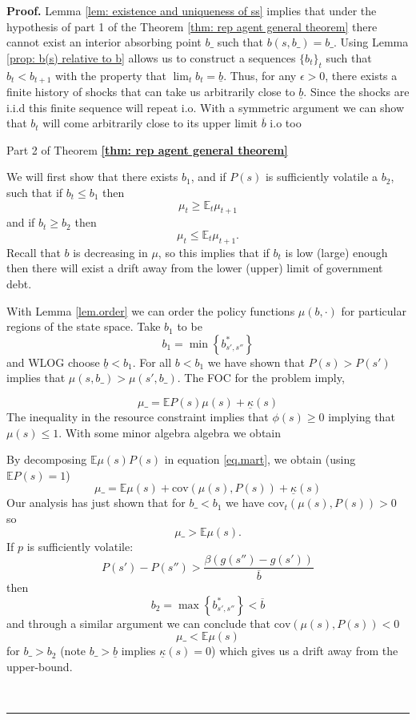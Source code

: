 \documentclass[thmsb,11pt]{article}
\newcommand{\EE}{\mathbb E}
\newcommand{\cov}{\mathrm{cov}}
\newenvironment{proof}[1][Proof]{\noindent \textbf{#1.} }{\  \rule{0.5em}{0.5em}}
\begin{document}
\begin{proof}
Lemma  \ref{lem: existence and uniqueness of ss}  implies that under the hypothesis of part 1 of the Theorem \ref{thm: rep agent general theorem} there cannot exist an interior absorbing point $b\_$ such that $b(s,b\_)=b\_$. Using Lemma \ref{prop: b(s) relative to b} allows us to construct a sequences $\{b_t\}_t $ such that $b_t<b_{t+1}$ with the property that $\lim_tb_t=\underline{b}$.
Thus, for any $\epsilon>0$, there exists a finite history of shocks that can take us arbitrarily close to $\underline{b}$. Since the shocks are i.i.d this finite sequence will repeat i.o. With a symmetric argument we can show that $b_t$ will come arbitrarily close to its upper limit $\overline{b}$ i.o too





{Part 2 of Theorem \textbf{\ref{thm: rep agent general theorem}}}


We will first show that there exists $b_1$, and if $P(s)$ is sufficiently volatile a $b_2$, such that if $b_t\leq b_1$ then
\[
	\mu_t \geq \EE_t \mu_{t+1}
\] and if $b_t \geq b_2$ then
\[
	\mu_t \leq \EE_t \mu_{t+1}.
\]  Recall that $b$ is decreasing in $\mu$, so this implies that if $b_t$ is low (large) enough then there will exist a drift away from the lower (upper) limit of government debt.

With Lemma \ref{lem.order} we can order the policy functions $\mu(b,\cdot)$ for particular regions of the state space.  Take $b_1$ to be
\[
	b_1 = \min\left\{b^*_{s',s''}\right\}
\] and WLOG choose $\underline b < b_1$.  For all $b < b_1$ we have shown that $P(s) > P(s')$ implies that $\mu(s,b\_) > \mu(s',b\_)$.  The FOC for the problem imply,

\begin{equation}\label{eq.mart}
	\mu\_ = \EE P(s)\mu(s)+\underline{\kappa}(s)
\end{equation}  The inequality in the resource constraint implies that $\phi(s)\geq 0$ implying that $\mu(s) \leq 1$.  With some minor algebra algebra we obtain

By decomposing $\EE \mu(s)P(s)$ in equation \eqref{eq.mart}, we obtain (using $\EE P(s) = 1$)
\begin{equation}
	\mu\_ = \EE\mu(s) +\cov (\mu(s),P(s)) + \underline \kappa(s)
\end{equation}Our analysis has just shown that for $b\_ < b_1$ we have $\cov_t (\mu(s),P(s))  >0$ so
\[
	\mu\_> \EE\mu(s).
\]  If $p$ is sufficiently volatile:
\[
	P(s') - P(s'') > \frac{\beta(g(s'')-g(s'))}{\overline b}
\] then
\[
	b_2 = \max\left\{b^*_{s',s''}\right\} <\overline b
\] and through a similar argument  we can conclude that $\cov(\mu(s),P(s)) < 0$
\[
	\mu\_ < \EE \mu (s)
\] for $b\_ > b_2$ (note $b\_ >\underline b$ implies $\underline \kappa(s) =0$) which gives us a drift away from the upper-bound.



\end{proof}
\end{document}
